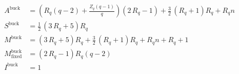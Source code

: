 \begin{align*}
A^{\mathrm{buck}} &= {\left(R_{q} {\left(q - 2\right)} + \frac{Z_{q} {\left(q - 1\right)}}{q}\right)} {\left(2 \, R_{q} - 1\right)} + \frac{3}{2} \, {\left(R_{q} + 1\right)} R_{q} + R_{q} n \\
S^{\mathrm{buck}} &= \frac{1}{2} \, {\left(3 \, R_{q} + 5\right)} R_{q} \\
M^{\mathrm{buck}} &= {\left(3 \, R_{q} + 5\right)} R_{q} + \frac{3}{2} \, {\left(R_{q} + 1\right)} R_{q} + R_{q} n + R_{q} + 1 \\
M_{\mathrm{fixed}}^{\mathrm{buck}} &= {\left(2 \, R_{q} - 1\right)} R_{q} {\left(q - 2\right)} \\
I^{\mathrm{buck}} &= 1 
\end{align*}
